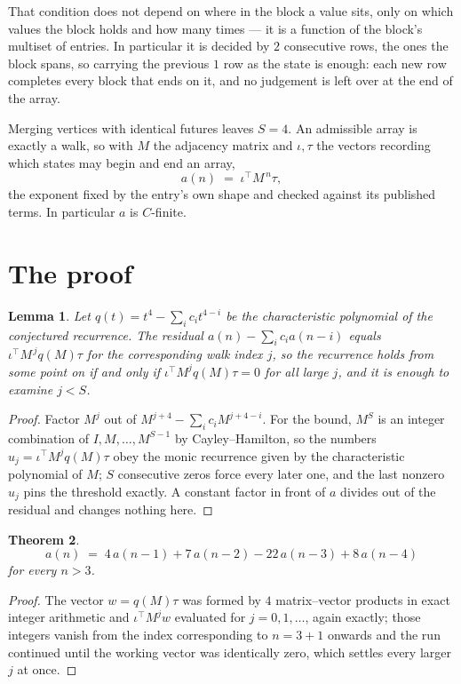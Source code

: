 \documentclass[11pt,a4paper]{article}
\theoremstyle{plain}
\newtheorem{theorem}{Theorem}
\newtheorem{lemma}[theorem]{Lemma}
\theoremstyle{definition}
\begin{document}
That condition does not depend on where in the block a value sits, only on which values the block holds and how many times --- it is a function of the block's multiset of entries. In particular it is decided by $2$ consecutive rows, the ones the block spans, so carrying the previous $1$ row as the state is enough: each new row completes every block that ends on it, and no judgement is left over at the end of the array.

Merging vertices with identical futures leaves $S=4$. An admissible array is exactly a walk, so with $M$ the adjacency matrix and $\iota,\tau$ the vectors recording which states may begin and end an array,
\[
a(n)\;=\;\iota^{\!\top}M^{\,n}\tau ,
\]
the exponent fixed by the entry's own shape and checked against its published terms. In
particular $a$ is $C$-finite.

\section{The proof}

\begin{lemma}\label{lem:crit}
Let $q(t)=t^{4}-\sum_i c_it^{4-i}$ be the characteristic polynomial of the
conjectured recurrence. The residual $a(n)-\sum_ic_ia(n-i)$ equals
$\iota^{\!\top}M^{\,j}q(M)\tau$ for the corresponding walk index $j$, so the recurrence
holds from some point on if and only if $\iota^{\!\top}M^{j}q(M)\tau=0$ for all large $j$,
and it is enough to examine $j<S$.
\end{lemma}

\begin{proof}
Factor $M^{j}$ out of $M^{j+4}-\sum_ic_iM^{j+4-i}$. For the bound, $M^{S}$
is an integer combination of $I,M,\dots,M^{S-1}$ by Cayley--Hamilton, so the numbers
$u_j=\iota^{\!\top}M^{j}q(M)\tau$ obey the monic recurrence given by the characteristic
polynomial of $M$; $S$ consecutive zeros force every later one, and the last nonzero $u_j$
pins the threshold exactly. A constant factor in front of $a$ divides out of the residual and
changes nothing here.
\end{proof}

\begin{theorem}
\[
a(n)\;=\;4\,a(n-1) + 7\,a(n-2) - 22\,a(n-3) + 8\,a(n-4)
\]
for every $n>3$.
\end{theorem}

\begin{proof}
The vector $w=q(M)\tau$ was formed by $4$ matrix--vector products in exact integer
arithmetic and $\iota^{\!\top}M^{j}w$ evaluated for $j=0,1,\dots$, again exactly; those
integers vanish from the index corresponding to $n=3+1$ onwards and the run continued
until the working vector was identically zero, which settles every larger $j$ at once.
\end{proof}
\end{document}
